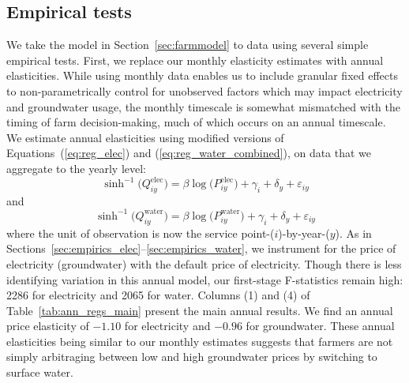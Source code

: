 \subsection{Empirical tests}
We take the model in Section~\ref{sec:farmmodel} to data using several simple empirical tests. First, we replace our monthly elasticity estimates with annual elasticities. While using monthly data enables us to include granular fixed effects to non-parametrically control for unobserved factors which may impact electricity and groundwater usage, the monthly timescale is somewhat mismatched with the timing of farm decision-making, much of which occurs on an annual timescale. We estimate annual elasticities using modified versions of Equations~(\ref{eq:reg_elec}) and (\ref{eq:reg_water_combined}), on data that we aggregate to the yearly level:
\begin{equation}
\sinh^{-1}\big(Q^{\text{elec}}_{iy}\big) = \beta \log\big(P^{\text{elec}}_{iy}\big) + \gamma_{i} + \delta_y + \varepsilon_{iy}
\label{eq:reg_elec_annual}
\end{equation}
and
\begin{equation}
\sinh^{-1}\big(Q^{\text{water}}_{iy}\big) = \beta\log\big({P}^{\text{water}}_{iy}\big) + \gamma_{i} + \delta_y + \varepsilon_{iy} \label{eq:reg_water_annual} 
\end{equation}
where the unit of observation is now the service point-($i$)-by-year-($y$). As in Sections~\ref{sec:empirics_elec}--\ref{sec:empirics_water}, we instrument for the price of electricity (groundwater) with the default price of electricity. Though there is less identifying variation in this annual model, our first-stage F-statistics remain high: 2286 for electricity and 2065 for water. Columns (1) and (4) of Table~\ref{tab:ann_regs_main} present the main annual results. We find an annual price elasticity of $-1.10$ for electricity and $-0.96$ for groundwater. These annual elasticities being similar to our monthly estimates suggests that farmers are not simply arbitraging between low and high groundwater prices by switching to surface water. 


